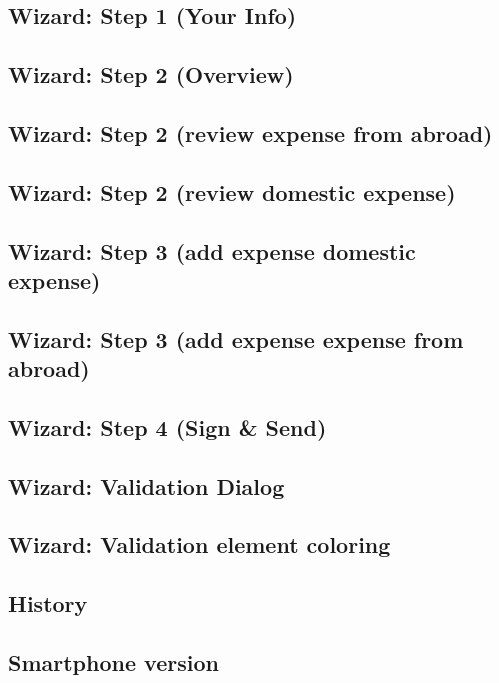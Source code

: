 \subsection{Wizard: Step 1 (Your Info)}

\subsection{Wizard: Step 2 (Overview)}

\subsection{Wizard: Step 2 (review expense from abroad)}

\subsection{Wizard: Step 2 (review domestic expense)}

\subsection{Wizard: Step 3 (add expense domestic expense)}

\subsection{Wizard: Step 3 (add expense expense from abroad)}

\subsection{Wizard: Step 4 (Sign \& Send)}

\subsection{Wizard: Validation Dialog}

\subsection{Wizard: Validation element coloring}

\subsection{History}

\subsection{Smartphone version}



